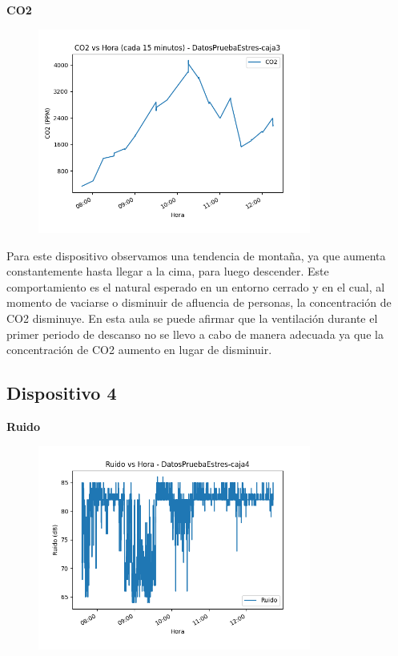 \documentclass{templateNote}
\begin{document}
\newpage
\textbf{CO2}
\begin{figure}[H]
    \centering
    \includegraphics[width=0.8\textwidth]{img/DatosPruebaEstres-caja3_co2_vs_hora_15min.png}
\end{figure}

\begin{tcolorbox}
    Para este dispositivo observamos una tendencia de montaña, ya que aumenta constantemente hasta llegar a la cima, para luego descender. Este comportamiento es el natural esperado en un entorno cerrado y en el cual, al momento de vaciarse o disminuir de afluencia de personas, la concentración de CO2 disminuye. En esta aula se puede afirmar que la ventilación durante el primer periodo de descanso no se llevo a cabo de manera adecuada ya que la concentración de CO2 aumento en lugar de disminuir.
\end{tcolorbox}

\newpage
\subsection{Dispositivo 4}
\textbf{Ruido}
\begin{figure}[H]
    \centering
    \includegraphics[width=0.8\textwidth]{img/DatosPruebaEstres-caja4_ruido_vs_hora.png}
\end{figure}
\end{document}
